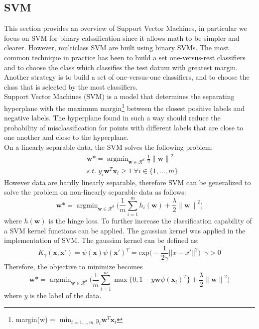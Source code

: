 \documentclass{article}
\DeclareMathOperator*{\argmin}{argmin}
\begin{document}
\subsection{SVM}
This section provides an overview of Support Vector Machines, in particular we focus on SVM for binary calssification since it allows math to be simpler and clearer. However, multiclass SVM are built using binary SVMs.  The most common technique in practice has been to build  a set one-versus-rest classifiers and to choose the class which classifies the test datum with greatest margin. Another strategy is to build a set of one-versus-one classifiers, and to choose the class that is selected by the most classifiers. \cite{svm}
\\
Support Vector Machines (SVM) is a model that determines the separating hyperplane with the maximum margin\footnote{margin(w) = $\min_{t=1,..,m} y_t\textbf{w}^T\textbf{x}_t$} between the closest positive labels and negative labels. The hyperplane found in such a way should reduce the probability of misclassification for points with different labels that are close to one another and close to the hyperplane. \\
On a linearly separable data, the SVM solves the following problem:
\begin{equation}
\begin{split}
   &   \textbf{w} \mbox{*} = \argmin_{\textbf{w} \in \mathcal{R}^d} \frac{1}{2} {\lVert \textbf{w} \rVert}^2 \\
   & s.t.\; y_i\textbf{w}^{T}\textbf{x}_i \geq 1 \; \forall i \in \{1, ...,m\} 
\end{split}
\end{equation}
However data are hardly linearly separable, therefore SVM can be generalized to solve the problem on non-linearly separable data as follows:
\begin{equation}
      \textbf{w} \mbox{*} = \argmin_{\textbf{w} \in \mathcal{R}^d} \bigg( \frac{1}{m}\sum_{i=1}^m h_i(\textbf{w}) + \frac{\lambda}{2} {\lVert \textbf{w} \rVert}^2 \bigg)
\end{equation}
where $h(\textbf{w})$ is the hinge loss.
To further increase the classification capability of a SVM kernel functions can be applied. The gaussian kernel was applied in the implementation of SVM.
The gaussian kernel can be defined as:
\begin{equation}
K_{\gamma}(\textbf{x},\textbf{x}') = \psi(\textbf{x}) \psi(\textbf{x}')^T  = \text{exp} \bigg( - \frac{1}{2 \gamma} ||x - x' ||^2 \bigg) \;\; \gamma > 0
\end{equation}
Therefore, the objective to minimize becomes
\begin{equation}
      \textbf{w} \mbox{*} = \argmin_{\textbf{w} \in \mathcal{R}^d} \bigg( \frac{1}{m}\sum_{i=1}^m \max\{0,1-y\textbf{w} \psi(\textbf{x}_i)^T\} + \frac{\lambda}{2} {\lVert \textbf{w} \rVert}^2 \bigg)
\end{equation}
where $y$ is the label of the data. \cite{book1} \cite{book2}
\end{document}
